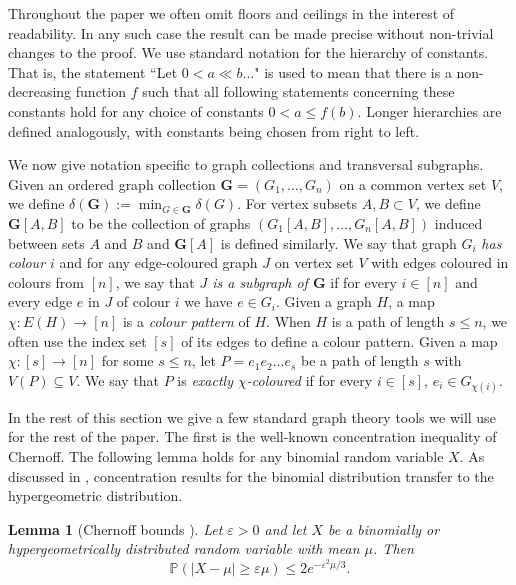 \documentclass[11pt, dvipsnames]{amsart}
\theoremstyle{plain}
\newtheorem{lemma}[theo]{Lemma}
\theoremstyle{definition}
\newcommand{\mb}[1]{\mathbb{#1}}
\newcommand{\eps}{\varepsilon}
\begin{document}
Throughout the paper we often omit floors and ceilings in the interest of readability. In any such case the result can be made precise without non-trivial changes to the proof. We use standard notation for the hierarchy of constants. That is, the statement ``Let $0<a\ll b\ldots$" is used to mean that there is  a non-decreasing function $f$ such that all following statements concerning these constants hold for any choice of constants $0<a\le f(b)$. Longer hierarchies are defined analogously, with constants being chosen from right to left.  

We now give notation specific to graph collections and transversal subgraphs. Given an ordered graph collection $\mathbf{G}=(G_1, \ldots, G_n)$ on a common vertex set $V$, we define $\delta(\mathbf{G}):= \min_{G \in \mathbf{G}} \delta(G)$.  For vertex subsets $A,B\subset V$, we define $\mathbf{G}[A,B]$ to be the collection of graphs $(G_1[A,B],\ldots,G_n[A,B])$  induced between sets $A$ and $B$ and $\mathbf{G}[A]$ is defined similarly.  We say that graph $G_i$ {\it has colour $i$} and for any edge-coloured graph $J$ on vertex set $V$ with edges coloured in colours from $[n]$, we say that {\it $J$ is a subgraph of $\mathbf{G}$} if for every $i \in [n]$ and every edge $e$ in $J$ of colour $i$ we have $e \in G_i$.
Given a graph $H$, a map $\chi: E(H) \rightarrow [n]$ is a \emph{colour pattern} of $H$.
When $H$ is a path of length $s \leq n$, we often use the index set $[s]$ of its edges to define a colour pattern. 
Given a map $\chi: [s] \rightarrow [n]$ for some $s \leq n$, let $P=e_1e_2\ldots e_s$ be a path of length $s$ with $V(P) \subseteq V$. We say that $P$ is {\it exactly $\chi$-coloured} if for every $i \in [s]$, $e_i \in G_{\chi(i)}$. 

In the rest of this section we give a few standard graph theory tools we will use for the rest of the paper. The first is the well-known concentration inequality of Chernoff. The following lemma holds for any binomial random variable $X$. As discussed in \cite[Section 21.5]{frieze2015introduction}, concentration results for the binomial distribution transfer to the hypergeometric distribution.

\begin{lemma}[Chernoff bounds {\cite[Corollary 21.7]{frieze2015introduction}}]    \label{lem:chernoff}
    Let $\eps>0$ and let $X$ be a binomially or hypergeometrically distributed random variable with mean $\mu$. Then
    \[\mb P(|X-\mu|\ge \eps \mu)\le 2e^{-\eps^2\mu/3}.\]

\end{lemma}
\end{document}
